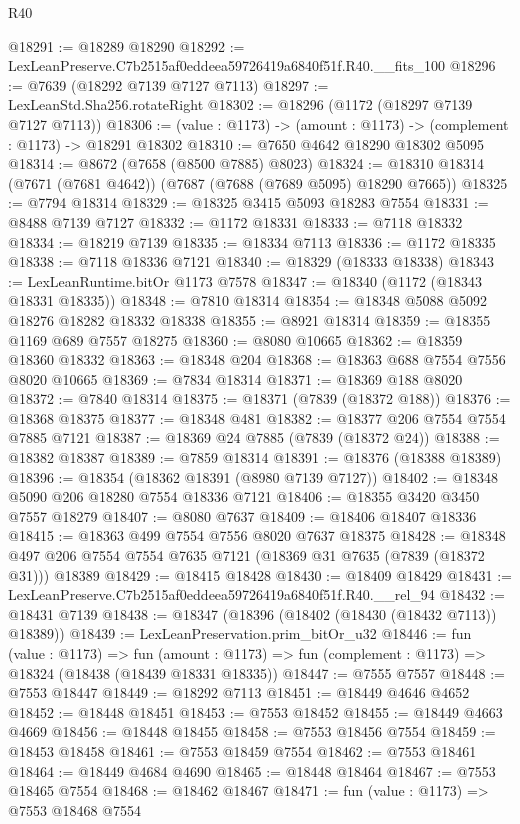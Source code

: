 \begin{lexlean}{R40}
\begin{coremodule}
@18291 := @18289 @18290
@18292 := LexLeanPreserve.C7b2515af0eddeea59726419a6840f51f.R40.__fits_100
@18296 := @7639 (@18292 @7139 @7127 @7113)
@18297 := LexLeanStd.Sha256.rotateRight
@18302 := @18296 (@1172 (@18297 @7139 @7127 @7113))
@18306 := (value : @1173) -> (amount : @1173) -> (complement : @1173) -> @18291 @18302
@18310 := @7650 @4642 @18290 @18302 @5095
@18314 := @8672 (@7658 (@8500 @7885) @8023)
@18324 := @18310 @18314 (@7671 (@7681 @4642)) (@7687 (@7688 (@7689 @5095) @18290 @7665))
@18325 := @7794 @18314
@18329 := @18325 @3415 @5093 @18283 @7554
@18331 := @8488 @7139 @7127
@18332 := @1172 @18331
@18333 := @7118 @18332
@18334 := @18219 @7139
@18335 := @18334 @7113
@18336 := @1172 @18335
@18338 := @7118 @18336 @7121
@18340 := @18329 (@18333 @18338)
@18343 := LexLeanRuntime.bitOr @1173 @7578
@18347 := @18340 (@1172 (@18343 @18331 @18335))
@18348 := @7810 @18314
@18354 := @18348 @5088 @5092 @18276 @18282 @18332 @18338
@18355 := @8921 @18314
@18359 := @18355 @1169 @689 @7557 @18275
@18360 := @8080 @10665
@18362 := @18359 @18360 @18332
@18363 := @18348 @204
@18368 := @18363 @688 @7554 @7556 @8020 @10665
@18369 := @7834 @18314
@18371 := @18369 @188 @8020
@18372 := @7840 @18314
@18375 := @18371 (@7839 (@18372 @188))
@18376 := @18368 @18375
@18377 := @18348 @481
@18382 := @18377 @206 @7554 @7554 @7885 @7121
@18387 := @18369 @24 @7885 (@7839 (@18372 @24))
@18388 := @18382 @18387
@18389 := @7859 @18314
@18391 := @18376 (@18388 @18389)
@18396 := @18354 (@18362 @18391 (@8980 @7139 @7127))
@18402 := @18348 @5090 @206 @18280 @7554 @18336 @7121
@18406 := @18355 @3420 @3450 @7557 @18279
@18407 := @8080 @7637
@18409 := @18406 @18407 @18336
@18415 := @18363 @499 @7554 @7556 @8020 @7637 @18375
@18428 := @18348 @497 @206 @7554 @7554 @7635 @7121 (@18369 @31 @7635 (@7839 (@18372 @31))) @18389
@18429 := @18415 @18428
@18430 := @18409 @18429
@18431 := LexLeanPreserve.C7b2515af0eddeea59726419a6840f51f.R40.__rel_94
@18432 := @18431 @7139
@18438 := @18347 (@18396 (@18402 (@18430 (@18432 @7113)) @18389))
@18439 := LexLeanPreservation.prim_bitOr_u32
@18446 := fun (value : @1173) =>
  fun (amount : @1173) => fun (complement : @1173) => @18324 (@18438 (@18439 @18331 @18335))
@18447 := @7555 @7557
@18448 := @7553 @18447
@18449 := @18292 @7113
@18451 := @18449 @4646 @4652
@18452 := @18448 @18451
@18453 := @7553 @18452
@18455 := @18449 @4663 @4669
@18456 := @18448 @18455
@18458 := @7553 @18456 @7554
@18459 := @18453 @18458
@18461 := @7553 @18459 @7554
@18462 := @7553 @18461
@18464 := @18449 @4684 @4690
@18465 := @18448 @18464
@18467 := @7553 @18465 @7554
@18468 := @18462 @18467
@18471 := fun (value : @1173) => @7553 @18468 @7554

\end{coremodule}
\end{lexlean}

